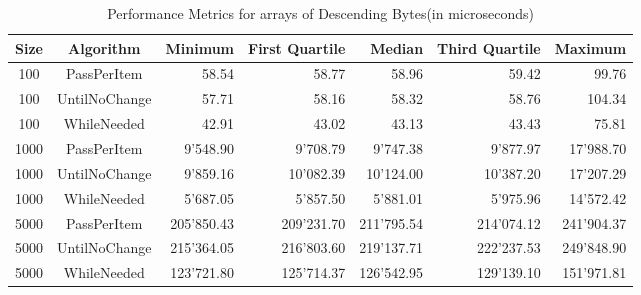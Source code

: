\documentclass{article}
\begin{document}
\begin{table}[htbp]
    \centering
    \begin{tabular}{ccrrrrr}
        \toprule
        \textbf{Size} & \textbf{Algorithm} & \textbf{Minimum} & \textbf{First Quartile} & \textbf{Median} & \textbf{Third Quartile} & \textbf{Maximum} \\
        \midrule
        100 & PassPerItem & 58.54 & 58.77 & 58.96 & 59.42 & 99.76 \\
        100 & UntilNoChange & 57.71 & 58.16 & 58.32 & 58.76 & 104.34 \\
        100 & WhileNeeded & 42.91 & 43.02 & 43.13 & 43.43 & 75.81 \\
        1000 & PassPerItem & 9'548.90 & 9'708.79 & 9'747.38 & 9'877.97 & 17'988.70 \\
        1000 & UntilNoChange & 9'859.16 & 10'082.39 & 10'124.00 & 10'387.20 & 17'207.29 \\
        1000 & WhileNeeded & 5'687.05 & 5'857.50 & 5'881.01 & 5'975.96 & 14'572.42 \\
        5000 & PassPerItem & 205'850.43 & 209'231.70 & 211'795.54 & 214'074.12 & 241'904.37 \\
        5000 & UntilNoChange & 215'364.05 & 216'803.60 & 219'137.71 & 222'237.53 & 249'848.90 \\
        5000 & WhileNeeded & 123'721.80 & 125'714.37 & 126'542.95 & 129'139.10 & 151'971.81 \\
        \bottomrule
    \end{tabular}
    \caption{Performance Metrics for arrays of Descending Bytes(in microseconds)}
    \label{tab:performance_2}
\end{table}
\end{document}

